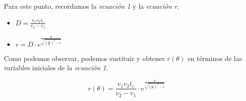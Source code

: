 \documentclass[a4paper,12pt]{article} %
\begin{document}
\vspace{\baselineskip}

\begin{justify}
    Para este punto, recordamos la \textit{ecuación 1} y la \textit{ecuación r}.
\end{justify}
\begin{itemize}
    \item \( D = \frac{v_1v_2t_c}{v_2-v_1} \)
    \item \(r = D \cdot e^{\frac{\theta}{\sqrt{\left(\frac{v_2}{v_1}\right)^2 -1}}} \)
\end{itemize}

\begin{justify}
    Como podemos observar, podemos sustituir y obtener \( r(\theta) \) en términos de las variables iniciales de la \textit{ecuación 1}.
\end{justify}
\vspace{\baselineskip}

\[
\boxed{r(\theta) = \frac{v_1v_2t_c}{v_2-v_1} \cdot e^{\frac{\theta}{\sqrt{\left(\frac{v_2}{v_1}\right)^2 -1}}} }
\]
\end{document}
